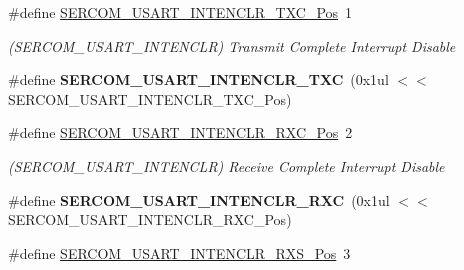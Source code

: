 \begin{DoxyCompactItemize}
\item 
\hypertarget{group___s_a_m_l21___s_e_r_c_o_m_gad3b58c8f35e905c70a1cda440b78c5ae}{}\#define \hyperlink{group___s_a_m_l21___s_e_r_c_o_m_gad3b58c8f35e905c70a1cda440b78c5ae}{S\+E\+R\+C\+O\+M\+\_\+\+U\+S\+A\+R\+T\+\_\+\+I\+N\+T\+E\+N\+C\+L\+R\+\_\+\+T\+X\+C\+\_\+\+Pos}~1\label{group___s_a_m_l21___s_e_r_c_o_m_gad3b58c8f35e905c70a1cda440b78c5ae}

\begin{DoxyCompactList}\small\item\em (S\+E\+R\+C\+O\+M\+\_\+\+U\+S\+A\+R\+T\+\_\+\+I\+N\+T\+E\+N\+C\+L\+R) Transmit Complete Interrupt Disable \end{DoxyCompactList}\item 
\hypertarget{group___s_a_m_l21___s_e_r_c_o_m_ga5e54c2bf9174cbf52f09fd0d86e2b601}{}\#define {\bfseries S\+E\+R\+C\+O\+M\+\_\+\+U\+S\+A\+R\+T\+\_\+\+I\+N\+T\+E\+N\+C\+L\+R\+\_\+\+T\+X\+C}~(0x1ul $<$$<$ S\+E\+R\+C\+O\+M\+\_\+\+U\+S\+A\+R\+T\+\_\+\+I\+N\+T\+E\+N\+C\+L\+R\+\_\+\+T\+X\+C\+\_\+\+Pos)\label{group___s_a_m_l21___s_e_r_c_o_m_ga5e54c2bf9174cbf52f09fd0d86e2b601}

\item 
\hypertarget{group___s_a_m_l21___s_e_r_c_o_m_ga9f9d85618e88340f21bc33ea5e3a0aef}{}\#define \hyperlink{group___s_a_m_l21___s_e_r_c_o_m_ga9f9d85618e88340f21bc33ea5e3a0aef}{S\+E\+R\+C\+O\+M\+\_\+\+U\+S\+A\+R\+T\+\_\+\+I\+N\+T\+E\+N\+C\+L\+R\+\_\+\+R\+X\+C\+\_\+\+Pos}~2\label{group___s_a_m_l21___s_e_r_c_o_m_ga9f9d85618e88340f21bc33ea5e3a0aef}

\begin{DoxyCompactList}\small\item\em (S\+E\+R\+C\+O\+M\+\_\+\+U\+S\+A\+R\+T\+\_\+\+I\+N\+T\+E\+N\+C\+L\+R) Receive Complete Interrupt Disable \end{DoxyCompactList}\item 
\hypertarget{group___s_a_m_l21___s_e_r_c_o_m_gae122ff26ec75bb8caed1a24e97aecb5f}{}\#define {\bfseries S\+E\+R\+C\+O\+M\+\_\+\+U\+S\+A\+R\+T\+\_\+\+I\+N\+T\+E\+N\+C\+L\+R\+\_\+\+R\+X\+C}~(0x1ul $<$$<$ S\+E\+R\+C\+O\+M\+\_\+\+U\+S\+A\+R\+T\+\_\+\+I\+N\+T\+E\+N\+C\+L\+R\+\_\+\+R\+X\+C\+\_\+\+Pos)\label{group___s_a_m_l21___s_e_r_c_o_m_gae122ff26ec75bb8caed1a24e97aecb5f}

\item 
\hypertarget{group___s_a_m_l21___s_e_r_c_o_m_ga41deb2b6ee25dfba896a6e95c01e8cb4}{}\#define \hyperlink{group___s_a_m_l21___s_e_r_c_o_m_ga41deb2b6ee25dfba896a6e95c01e8cb4}{S\+E\+R\+C\+O\+M\+\_\+\+U\+S\+A\+R\+T\+\_\+\+I\+N\+T\+E\+N\+C\+L\+R\+\_\+\+R\+X\+S\+\_\+\+Pos}~3\label{group___s_a_m_l21___s_e_r_c_o_m_ga41deb2b6ee25dfba896a6e95c01e8cb4}


\end{DoxyCompactItemize}
